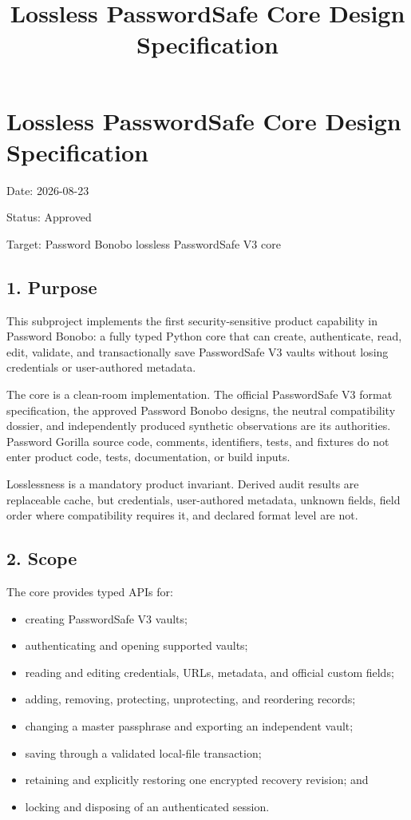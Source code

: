 \documentclass[
  letterpaper,
]{article}
\title{Lossless PasswordSafe Core Design Specification}
\author{}
\date{}
\providecommand{\tightlist}{%
  \setlength{\itemsep}{0pt}\setlength{\parskip}{0pt}}
\begin{document}
\maketitle

{
\setcounter{tocdepth}{3}
\tableofcontents
}
\section{Lossless PasswordSafe Core Design Specification}\label{lossless-passwordsafe-core-design-specification}

Date: 2026-08-23

Status: Approved

Target: Password Bonobo lossless PasswordSafe V3 core

\subsection{1. Purpose}\label{1-purpose}

This subproject implements the first security-sensitive product capability in Password Bonobo: a fully typed Python core
that can create, authenticate, read, edit, validate, and transactionally save PasswordSafe V3 vaults without losing
credentials or user-authored metadata.

The core is a clean-room implementation. The official PasswordSafe V3 format specification, the approved Password Bonobo
designs, the neutral compatibility dossier, and independently produced synthetic observations are its authorities.
Password Gorilla source code, comments, identifiers, tests, and fixtures do not enter product code, tests,
documentation, or build inputs.

Losslessness is a mandatory product invariant. Derived audit results are replaceable cache, but credentials,
user-authored metadata, unknown fields, field order where compatibility requires it, and declared format level are not.

\subsection{2. Scope}\label{2-scope}

The core provides typed APIs for:

\begin{itemize}
\tightlist
\item
  creating PasswordSafe V3 vaults;
\item
  authenticating and opening supported vaults;
\item
  reading and editing credentials, URLs, metadata, and official custom fields;
\item
  adding, removing, protecting, unprotecting, and reordering records;
\item
  changing a master passphrase and exporting an independent vault;
\item
  saving through a validated local-file transaction;
\item
  retaining and explicitly restoring one encrypted recovery revision; and
\item
  locking and disposing of an authenticated session.
\end{itemize}
\end{document}
